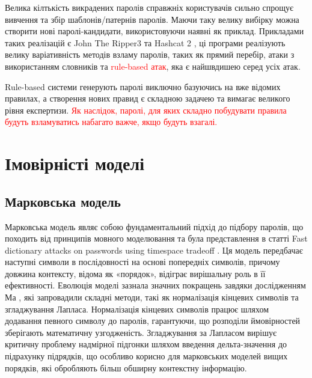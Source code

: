 Велика кілтькість викрадених паролів справжніх користувачів сильно спрощує вивчення та збір шаблонів/патернів паролів. Маючи таку велику вибірку можна створити нові паролі-кандидати, використовуючи наявні як приклад. Прикладами таких реалізацій є John The Ripper3 \cite{John the Ripper 3} та Hashcat 2 \cite{Hashcat 2}, ці програми реалізують велику варіативність методів взламу паролів, таких як прямий перебір, атаки з використанням словників та \textcolor{red}{rule-based атак}, яка є найшвдишею серед усіх атак. 

\begin{remark}
Rule-based системи генерують паролі виключно базуючись на вже відомих правилах, а створення нових правид є складною задачею та вимагає великого рівня експертизи. \textcolor{red}{Як наслідок, паролі, для яких складно побудувати правила будуть взламуватись набагато важче, якщо будуть взагалі.}
\end{remark}

\section{Імовірністі моделі}
\subsection{Марковська модель}
Марковська модель являє собою фундаментальний підхід до підбору паролів, що походить від принципів мовного моделювання та була представлення в статті Fast dictionary attacks on passwords using timespace tradeoﬀ \cite{Fast dictionary attacks on passwords using timespace tradeoﬀ}. Ця модель передбачає наступні символи в послідовності на основі попередніх символів, причому довжина контексту, відома як «порядок», відіграє вирішальну роль в її ефективності. Еволюція моделі зазнала значних покращень завдяки дослідженням Ма \cite{A study of probabilistic password models}, які запровадили складні методи, такі як нормалізація кінцевих символів та згладжування Лапласа. Нормалізація кінцевих символів працює шляхом додавання певного символу до паролів, гарантуючи, що розподіли ймовірностей зберігають математичну узгодженість. Згладжування за Лапласом вирішує критичну проблему надмірної підгонки шляхом введення дельта-значення до підрахунку підрядків, що особливо корисно для марковських моделей вищих порядків, які обробляють більш обширну контекстну інформацію.

